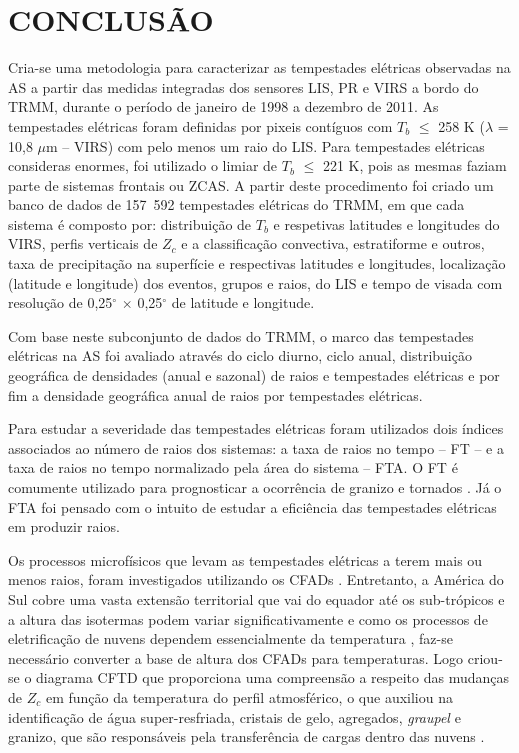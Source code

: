 \chapter{CONCLUSÃO}

Cria-se uma metodologia para caracterizar as tempestades elétricas observadas na AS a partir das medidas integradas dos sensores LIS, PR e VIRS a bordo do TRMM, durante o período de janeiro de 1998 a dezembro de 2011. As tempestades elétricas foram definidas por pixeis contíguos com $T_b$ $\leq$ 258 K ($\lambda$ = 10,8 $\mu$m -- VIRS) com pelo menos um raio do LIS. Para tempestades elétricas consideras enormes, foi utilizado o limiar de $T_b$ $\leq$ 221 K, pois as mesmas faziam parte de sistemas frontais ou ZCAS. A partir deste procedimento foi criado um banco de dados de 157~592 tempestades elétricas do TRMM, em que cada sistema é composto por: distribuição de $T_b$ e respetivas latitudes e longitudes do VIRS, perfis verticais de $Z_c$ e a classificação convectiva, estratiforme e outros, taxa de precipitação na superfície e respectivas latitudes e longitudes, localização (latitude e longitude) dos eventos, grupos e raios, do LIS e tempo de visada com resolução de 0,25$^{\circ}$ $\times$ 0,25$^{\circ}$ de latitude e longitude.

Com base neste subconjunto de dados do TRMM, o marco das tempestades elétricas na AS foi avaliado através  do ciclo diurno, ciclo anual, distribuição geográfica de densidades (anual e sazonal) de raios e tempestades elétricas e por fim a densidade geográfica anual de raios por tempestades elétricas.

Para estudar a severidade das tempestades elétricas foram utilizados dois índices associados ao número de raios dos sistemas: a taxa de raios no tempo -- FT -- e a taxa de raios no tempo normalizado pela área do sistema -- FTA. O FT é comumente utilizado  para prognosticar a ocorrência de granizo e tornados \cite{williams1999,goodman1988,schultz2011,gatlin2010}. Já o FTA foi pensado com o intuito de estudar a eficiência das tempestades elétricas em produzir raios. 


Os processos microfísicos que levam as tempestades elétricas a terem mais ou menos raios, foram investigados utilizando os CFADs \cite{yuter1995}. Entretanto, a América do Sul cobre uma vasta extensão territorial que vai do equador até os sub-trópicos e a altura das isotermas podem variar significativamente e como os processos de eletrificação de nuvens  dependem essencialmente da temperatura \cite{Takahashi1978}, faz-se necessário converter a base de altura dos CFADs para temperaturas. Logo criou-se o diagrama CFTD que proporciona uma compreensão a respeito das mudanças de $Z_c$ em função da temperatura do perfil atmosférico, o que auxiliou na identificação de água super-resfriada, cristais de gelo, agregados, \textit{graupel} e granizo, que são responsáveis pela transferência de cargas dentro das nuvens \cite{Takahashi1978,saunders2008}.


